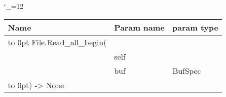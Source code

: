 \begingroup \catcode`\_=12 \tt
\begin{tabular}{lll}
\toprule
\textrm{Name}&\textrm{Param name}&\textrm{param type}\\
\midrule
\hbox to 0pt {File.Read_all_begin(\hss}\\
& self\\
& buf & BufSpec\\
\hbox to 0pt{) -> None\hss}\\
\bottomrule
\end{tabular}
\endgroup
